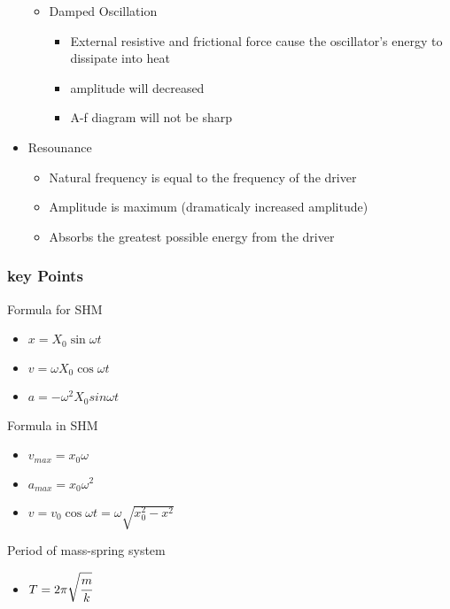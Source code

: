 \documentclass[]{article}
\begin{document}
\begin{itemize}
  \begin{itemize}
  \item
    Damped Oscillation

    \begin{itemize}
    \item
      External resistive and frictional force cause the oscillator's
      energy to dissipate into heat
    \item
      amplitude will decreased
    \item
      A-f diagram will not be sharp
    \end{itemize}
  \end{itemize}
\item
  Resounance

  \begin{itemize}
  \item
    Natural frequency is equal to the frequency of the driver
  \item
    Amplitude is maximum (dramaticaly increased amplitude)
  \item
    Absorbs the greatest possible energy from the driver
  \end{itemize}
\end{itemize}

\subsubsection{key Points}\label{header-n110}

Formula for SHM

\begin{itemize}
\item
  \(x = X_0 \sin{\omega t}\)
\item
  \(v = \omega X_0 \cos{\omega t}\)
\item
  \(a = -\omega^2 X_0 sin{\omega t}\)
\end{itemize}

Formula in SHM

\begin{itemize}
\item
  \(v_{max} = x_0\omega\)
\item
  \(a_{max} = x_0 \omega^2\)
\item
  \(v = v_0\cos{\omega t}  = \omega \sqrt{x_0^2 - x^2}\)
\end{itemize}

Period of mass-spring system

\begin{itemize}
\item
  \(T = 2\pi\sqrt{\cfrac{m}{k}}\)
\end{itemize}
\end{document}
